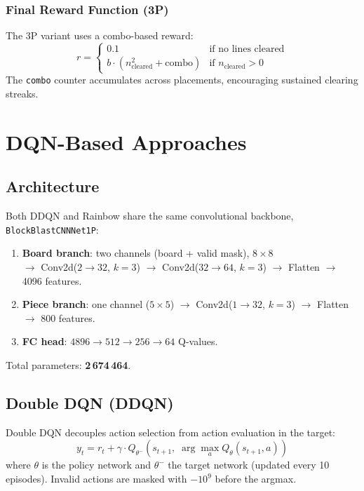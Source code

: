 \documentclass[10pt]{article}
\begin{document}
\subsubsection{Final Reward Function (3P)}

The 3P variant uses a combo-based reward:
\[
r = \begin{cases}
0.1 & \text{if no lines cleared} \\
b \cdot (n_{\text{cleared}}^2 + \text{combo}) & \text{if } n_{\text{cleared}} > 0
\end{cases}
\]
The \texttt{combo} counter accumulates across placements, encouraging sustained clearing streaks.

\section{DQN-Based Approaches}
\label{sec:dqn}

\subsection{Architecture}

Both DDQN and Rainbow share the same convolutional backbone, \texttt{BlockBlastCNNNet1P}:
\begin{enumerate}
    \item \textbf{Board branch}: two channels (board + valid mask), $8\times8$ \\ $\to$ Conv2d($2\to32$, $k=3$) $\to$ Conv2d($32\to64$, $k=3$) $\to$ Flatten $\to$ 4096 features.
    \item \textbf{Piece branch}: one channel ($5\times5$) $\to$ Conv2d($1\to32$, $k=3$) $\to$ Flatten $\to$ 800 features.
    \item \textbf{FC head}: $4896 \to 512 \to 256 \to 64$ Q-values.
\end{enumerate}
Total parameters: \textbf{2\,674\,464}.

\subsection{Double DQN (DDQN)}

Double DQN decouples action selection from action evaluation in the target:
\[
y_t = r_t + \gamma \cdot Q_{\theta^-}\!\left(s_{t+1},\; \arg\max_a Q_\theta(s_{t+1}, a)\right)
\]
where $\theta$ is the policy network and $\theta^-$ the target network (updated every 10 episodes). Invalid actions are masked with $-10^9$ before the argmax.
\end{document}

